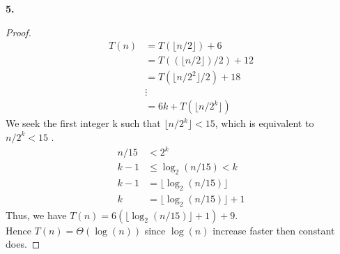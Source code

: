 \documentclass[12pt]{article}
\begin{document}
\noindent \textbf{5.}
\begin{proof}
	\begin{align*}
		T(n)&=T(\lfloor n/2\rfloor)+6\\
		&=T((\lfloor n/2\rfloor)/2)+12\\
		&=T(\lfloor n/2^2\rfloor/2)+18\\
		&\vdots\\
		&=6k+T(\lfloor n/2^k\rfloor)
	\end{align*}
	We seek the first integer k such that $\lfloor n/2^k\rfloor<15$, which is equivalent to $n/2^k<15$ .
	\begin{align*}
		n/15&<2^k\\
		k-1&\le\log_2(n/15)<k\\
		k-1&=\lfloor \log_2(n/15)\rfloor\\
		k&=\lfloor \log_2(n/15)\rfloor+1
	\end{align*}
	Thus, we have $T(n)=6(\lfloor \log_2(n/15)\rfloor+1)+9$.\\
	Hence $T(n)=\Theta(\log(n))$ since $\log(n)$ increase faster then constant does.
\end{proof}
\end{document}
